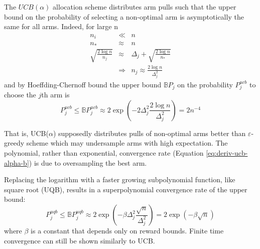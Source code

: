 \documentclass{article}
\begin{document}
The $UCB(\alpha)$ allocation scheme distributes arm pulls such that
the upper bound on the probability of selecting a non-optimal arm is
asymptotically the same for all arms. Indeed, for large n
\begin{eqnarray}
n_i&\ll&n\\
n_*&\approx&n\\
\sqrt {\frac {2 \log n} {n_j}}&\approx&\Delta_j+\sqrt {\frac {2\log n}
  {n_*}} \\
&\Rightarrow& n_j \approx \frac {2\log n} {\Delta_j^2}
\label{eq:deriv-ucb-asymptotic-nj}
\end{eqnarray}
and by Hoeffding-Chernoff bound the upper bound $\mathbb{B}P_j$ on the probability
$P_j^{ucb}$ to choose the $j$th arm is
\begin{equation}
P_j^{ucb}\le\mathbb{B}P_j^{ucb}\approx2\exp\left(-2\Delta_j^2\frac {2\log n}{\Delta_j^2}\right)
             =2n^{-4}
\end{equation}

That is, UCB($\alpha$) supposedly distributes pulls of non-optimal
arms better than $\varepsilon$-greedy
scheme which may undersample arms with high expectation. The
polynomial, rather than exponential, convergence rate (Equation
\ref{eq:deriv-ucb-alpha-b}) is due to oversampling the best arm.

Replacing the logarithm with a faster growing subpolynomial
function, like square root (UQB), results in a superpolynomial convergence
rate of the upper bound:
\begin{equation}
P_j^{uqb}\le\mathbb{B}P_j^{uqb}\approx2\exp\left(-\beta\Delta_j^2\frac {\sqrt n}{\Delta_j^2}\right)
            =2\exp(-\beta\sqrt n)
 \end{equation}
where $\beta$ is a constant that depends only on reward bounds.
Finite time convergence can still be shown similarly to UCB.




\end{document}

